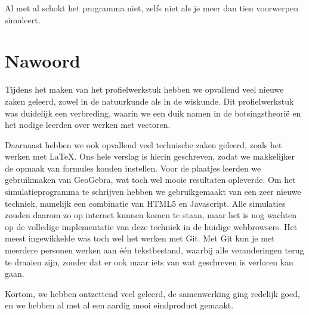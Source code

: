 \documentclass[12pt,a4paper]{article}
\begin{document}
	Al met al schokt het programma niet, zelfs niet als je meer dan tien voorwerpen simuleert.
	
	\newpage
	
	\section{Nawoord}
	Tijdens het maken van het profielwerkstuk hebben we opvallend veel nieuwe zaken geleerd, zowel in de natuurkunde als in de wiskunde. Dit profielwerkstuk was duidelijk een verbreding, waarin we een duik namen in de botsingstheori\"{e} en het nodige leerden over werken met vectoren.
	
	Daarnaast hebben we ook opvallend veel technische zaken geleerd, zoals het werken met \LaTeX. Ons hele verslag is hierin geschreven, zodat we makkelijker de opmaak van formules konden instellen. Voor de plaatjes leerden we gebruikmaken van GeoGebra, wat toch wel mooie resultaten opleverde. Om het simulatieprogramma te schrijven hebben we gebruikgemaakt van een zeer nieuwe techniek, namelijk een combinatie van HTML5 en Javascript. Alle simulaties zouden daarom zo op internet kunnen komen te staan, maar het is nog wachten op de volledige implementatie van deze techniek in de huidige webbrowsers. Het meest ingewikkelde was toch wel het werken met Git. Met Git kun je met meerdere personen werken aan \'{e}\'{e}n tekstbestand, waarbij alle veranderingen terug te draaien zijn, zonder dat er ook maar iets van wat geschreven is verloren kan gaan.
	
	Kortom, we hebben ontzettend veel geleerd, de samenwerking ging redelijk goed, en we hebben al met al een aardig mooi eindproduct gemaakt.
\end{document}
